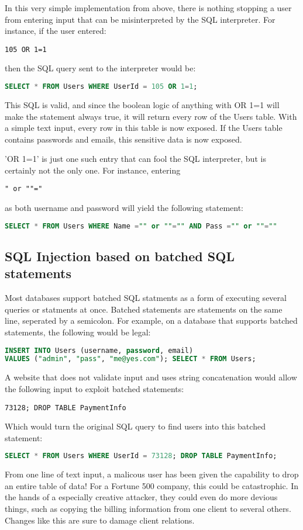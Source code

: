 In this very simple implementation from above, there is nothing stopping a user from entering input that can be misinterpreted by the SQL interpreter. For instance, if the user entered:
\begin{verbatim}
105 OR 1=1
\end{verbatim}
then the SQL query sent to the interpreter would be:
\begin{lstlisting}[language = SQL]
SELECT * FROM Users WHERE UserId = 105 OR 1=1;
\end{lstlisting}
This SQL is valid, and since the boolean logic of anything with OR 1=1 will make the statement always true, it will return every row of the Users table. With a simple text input, every row in this table is now exposed. If the Users table contains passwords and emails, this sensitive data is now exposed.

'OR 1=1' is just one such entry that can fool the SQL interpreter, but is certainly not the only one. For instance, entering 
\begin{verbatim}
" or ""="
\end{verbatim}
as both username and password will yield the following statement:
\begin{lstlisting}[language = SQL]
SELECT * FROM Users WHERE Name ="" or ""="" AND Pass ="" or ""=""
\end{lstlisting}

\subsection{SQL Injection based on batched SQL statements}

Most databases support batched SQL statments as a form of executing several queries or statments at once. Batched statements are statements on the same line, seperated by a semicolon. For example, on a database that supports batched statements, the following would be legal:
\begin{lstlisting}[language = SQL]
INSERT INTO Users (username, password, email) 
VALUES ("admin", "pass", "me@yes.com"); SELECT * FROM Users;
\end{lstlisting}
A website that does not validate input and uses string concatenation would allow the following input to exploit batched statements:
\begin{verbatim}
73128; DROP TABLE PaymentInfo
\end{verbatim}
Which would turn the original SQL query to find users into this batched statement:
\begin{lstlisting}[language = SQL]
SELECT * FROM Users WHERE UserId = 73128; DROP TABLE PaymentInfo; 
\end{lstlisting}
From one line of text input, a malicous user has been given the capability to drop an entire table of data! For a Fortune 500 company, this could be catastrophic. In the hands of a especially creative attacker, they could even do more devious things, such as copying the billing information from one client to several others. Changes like this are sure to damage client relations.

